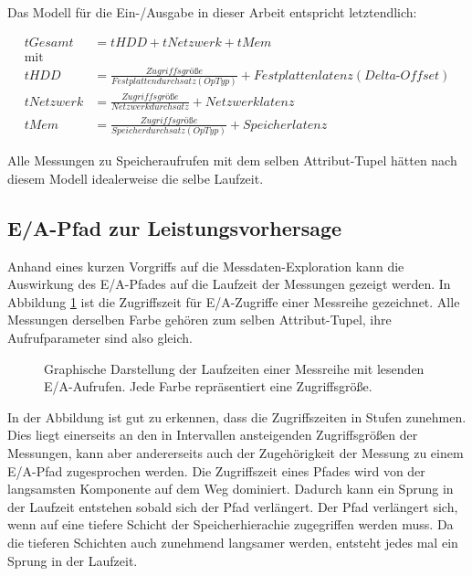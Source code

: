 \documentclass[
	12pt,
	a4paper,
	BCOR10mm,
	DIV14,
	listof=totoc,
	bibliography=totoc,
	headsepline
]{scrreprt}
\begin{document}
Das Modell für die Ein-/Ausgabe in dieser Arbeit entspricht letztendlich:

\begin{align*}
tGesamt &= tHDD + tNetzwerk + tMem\\
\text{mit}\\
tHDD &= \frac{Zugriffsgrö\text{ß}e}{Festplattendurchsatz(OpTyp)} + Festplattenlatenz(Delta\text{-}Offset) \\
tNetzwerk &= \frac{Zugriffsgrö\text{ß}e}{Netzwerkdurchsatz} + Netzwerklatenz\\
tMem &= \frac{Zugriffsgrö\text{ß}e}{Speicherdurchsatz(OpTyp)} + Speicherlatenz
\end{align*}

Alle Messungen zu Speicheraufrufen mit dem selben Attribut-Tupel hätten nach diesem Modell idealerweise die selbe Laufzeit.

\subsection{E/A-Pfad zur Leistungsvorhersage}
\label{analyse:ea_pfad_zurvorhersage}
Anhand eines kurzen Vorgriffs auf die Messdaten-Exploration kann die Auswirkung des E/A-Pfades auf die Laufzeit der Messungen gezeigt werden.
In Abbildung \ref{fig:pfad_for_vorhersage} ist die Zugriffszeit für E/A-Zugriffe einer Messreihe gezeichnet. Alle Messungen derselben Farbe gehören zum selben Attribut-Tupel, ihre Aufrufparameter sind also gleich.
\begin{figure}
	\begin{center}
		\caption{Graphische Darstellung der Laufzeiten einer Messreihe mit lesenden E/A-Aufrufen. Jede Farbe repräsentiert eine Zugriffsgröße.}
		\label{fig:pfad_for_vorhersage}
	\end{center}
\end{figure}
In der Abbildung ist gut zu erkennen, dass die Zugriffszeiten in Stufen zunehmen.
Dies liegt einerseits an den in Intervallen ansteigenden Zugriffsgrößen der Messungen, kann aber andererseits auch der Zugehörigkeit der Messung zu einem E/A-Pfad zugesprochen werden.
Die Zugriffszeit eines Pfades wird von der langsamsten Komponente auf dem Weg dominiert.
Dadurch kann ein Sprung in der Laufzeit entstehen sobald sich der Pfad verlängert. Der Pfad verlängert sich, wenn auf eine tiefere Schicht der Speicherhierachie zugegriffen werden muss. Da die tieferen Schichten auch zunehmend langsamer werden, entsteht jedes mal ein Sprung in der Laufzeit.\medskip
\end{document}
